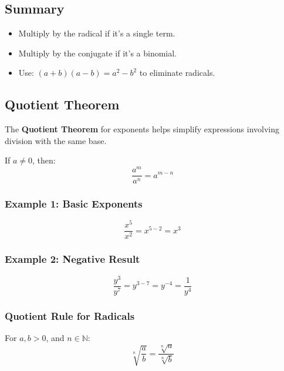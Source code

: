 \documentclass[11pt]{article}
\begin{document}
\subsection*{Summary}

\begin{tcolorbox}[colback=gray!5!white, colframe=black, title=Rationalizing Rules]
\begin{itemize}
  \item Multiply by the radical if it's a single term.
  \item Multiply by the conjugate if it's a binomial.
  \item Use: \( (a + b)(a - b) = a^2 - b^2 \) to eliminate radicals.
\end{itemize}
\end{tcolorbox}

\subsection{Quotient Theorem}

The \textbf{Quotient Theorem} for exponents helps simplify expressions involving division with the same base.

\begin{tcolorbox}[colback=green!5!white, colframe=green!50!black, title=Quotient Rule of Exponents]
If \( a \neq 0 \), then:
\[
\frac{a^m}{a^n} = a^{m - n}
\]
\end{tcolorbox}

\subsubsection*{Example 1: Basic Exponents}
\[
\frac{x^5}{x^2} = x^{5 - 2} = x^3
\]

\subsubsection*{Example 2: Negative Result}
\[
\frac{y^3}{y^7} = y^{3 - 7} = y^{-4} = \frac{1}{y^4}
\]

\subsubsection*{Quotient Rule for Radicals}

\begin{tcolorbox}[colback=blue!5!white, colframe=blue!70!black, title=Quotient Rule of Radicals]
For \( a, b > 0 \), and \( n \in \mathbb{N} \):
\[
\sqrt[n]{\frac{a}{b}} = \frac{\sqrt[n]{a}}{\sqrt[n]{b}}
\]
\end{tcolorbox}
\end{document}
